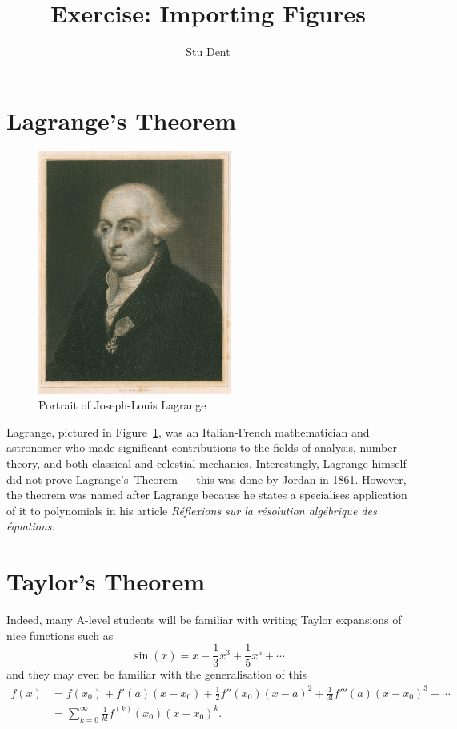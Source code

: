 \documentclass[a4paper,11pt]{article}
\title{Exercise: Importing Figures}
\author{Stu Dent}
\theoremstyle{plain}
\begin{document}
\maketitle

\section*{Lagrange's Theorem}

\begin{figure}[hbtp]
	\centering
	\includegraphics[width=2.5in]{lagrange-portrait.jpg}
	\caption{Portrait of Joseph-Louis Lagrange\protect\footnotemark}
	\label{fig:lagrange-portrait}
\end{figure}

Lagrange, pictured in Figure~\ref{fig:lagrange-portrait}, was an Italian-French mathematician and astronomer who made significant contributions to the fields of analysis, number theory, and both classical and celestial mechanics. Interestingly, Lagrange himself did not prove Lagrange's~Theorem --- this was done by Jordan in 1861. However, the theorem was named after Lagrange because he states a specialises application of it to polynomials in his article \textit{R{\'e}flexions sur la r{\'e}solution alg{\'e}brique des {\'e}quations}\citep{langrange-1770-reflexions}.

\section*{Taylor's Theorem}

Indeed, many A-level students will be familiar with writing Taylor expansions of nice functions such as
\begin{equation}\label{eqn:taylor-expansion-sin}
\sin(x) = x - \frac 13 x^3 + \frac 15 x^5 + \cdots
\end{equation}
and they may even be familiar with the generalisation of this
\begin{align*}
f(x) &= f(x_0) + f'(a)(x - x_0) + \frac 12 f''(x_0)(x - a)^2 + \frac 1{3!} f'''(a)(x - x_0)^3 + \cdots \\
&= \sum_{k=0}^\infty \frac{1}{k!} f^{(k)}(x_0) (x - x_0)^k.
\end{align*}
\end{document}
